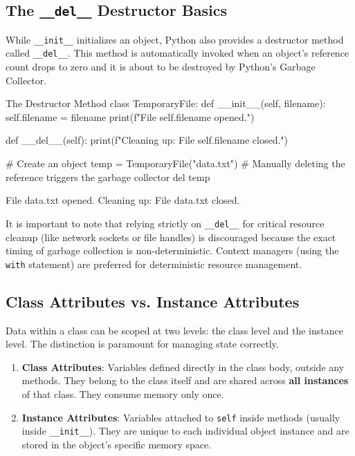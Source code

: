 \subsection{The \texttt{\_\_del\_\_} Destructor Basics}
While \texttt{\_\_init\_\_} initializes an object, Python also provides a destructor method called \texttt{\_\_del\_\_}. This method is automatically invoked when an object's reference count drops to zero and it is about to be destroyed by Python's Garbage Collector.

\begin{pythoncode}{The Destructor Method}
class TemporaryFile:
    def __init__(self, filename):
        self.filename = filename
        print(f"File {self.filename} opened.")
        
    def __del__(self):
        print(f"Cleaning up: File {self.filename} closed.")

# Create an object
temp = TemporaryFile("data.txt")
# Manually deleting the reference triggers the garbage collector
del temp 
\end{pythoncode}

\begin{outputbox}
File data.txt opened.
Cleaning up: File data.txt closed.
\end{outputbox}

It is important to note that relying strictly on \texttt{\_\_del\_\_} for critical resource cleanup (like network sockets or file handles) is discouraged because the exact timing of garbage collection is non-deterministic. Context managers (using the \texttt{with} statement) are preferred for deterministic resource management.

\subsection{Class Attributes vs. Instance Attributes}

Data within a class can be scoped at two levels: the class level and the instance level. The distinction is paramount for managing state correctly.

\begin{enumerate}[leftmargin=1.5em]
    \item \textbf{Class Attributes}: Variables defined directly in the class body, outside any methods. They belong to the class itself and are shared across \textbf{all instances} of that class. They consume memory only once.
    \item \textbf{Instance Attributes}: Variables attached to \texttt{self} inside methods (usually inside \texttt{\_\_init\_\_}). They are unique to each individual object instance and are stored in the object's specific memory space.
\end{enumerate}

